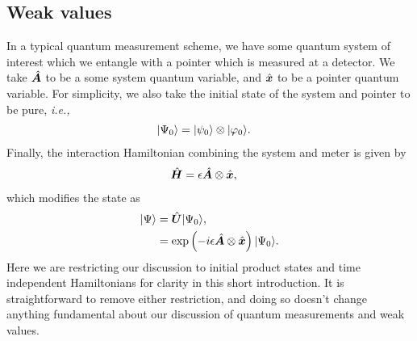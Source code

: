 \subsection{Weak values}
In a typical quantum measurement scheme, we have some quantum system of interest which we entangle with a pointer which is measured at a detector.  We take $\hat{\bm A}$ to be a some system quantum variable, and $\hat{\bm x}$ to be a pointer quantum variable.  For simplicity, we also take the initial state of the system and pointer to be pure, \emph{i.e.,}
\begin{align}
  \lvert \Psi_0\rangle &= \lvert \psi_0\rangle \otimes \lvert \varphi_0\rangle.
\end{align}
Finally, the interaction Hamiltonian combining the system and meter is given by
\begin{align}
  \hat{\bm H} &= \epsilon \hat{\bm A} \otimes \hat{\bm x},
\end{align}
which modifies the state as
\begin{align}
\nonumber  \lvert \Psi\rangle &= \hat{\bm U}\lvert \Psi_0\rangle, \\
                      &= \exp\left(-i\epsilon \hat{\bm A} \otimes \hat{\bm x} \right) \lvert \Psi_0\rangle.
\end{align}
Here we are restricting our discussion to initial product states and time independent Hamiltonians for clarity in this short introduction.  It is straightforward to remove either restriction, and doing so doesn't change anything fundamental about our discussion of quantum measurements and weak values.

